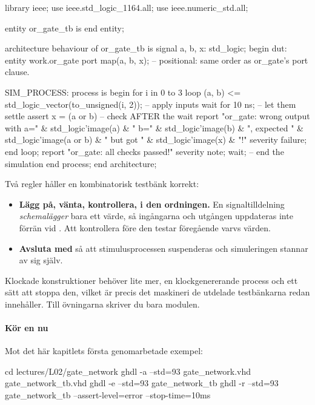 \begin{vhdlcode}
library ieee;
use ieee.std_logic_1164.all;
use ieee.numeric_std.all;

entity or_gate_tb is
end entity;

architecture behaviour of or_gate_tb is
signal a, b, x: std_logic;
begin
    dut: entity work.or_gate
        port map(a, b, x);   -- positional: same order as or_gate's port clause.

    SIM_PROCESS: process is
    begin
        for i in 0 to 3 loop
            (a, b) <= std_logic_vector(to_unsigned(i, 2));   -- apply inputs
            wait for 10 ns;                                  -- let them settle
            assert x = (a or b)                              -- check AFTER the wait
                report "or_gate: wrong output with a=" & std_logic'image(a)
                     & " b=" & std_logic'image(b)
                     & ", expected " & std_logic'image(a or b)
                     & " but got " & std_logic'image(x) & "!"
                severity failure;
        end loop;
        report "or_gate: all checks passed!" severity note;
        wait;                                                -- end the simulation
    end process;
end architecture;
\end{vhdlcode}

Två regler håller en kombinatorisk testbänk korrekt:
\begin{itemize}
  \item \textbf{Lägg på, vänta, kontrollera, i den ordningen.} En signaltilldelning
    \emph{schemalägger} bara ett värde, så ingångarna och utgången uppdateras inte förrän vid
    . Att kontrollera före den testar föregående varvs värden.
  \item \textbf{Avsluta med } så att stimulusprocessen suspenderas och simuleringen
    stannar av sig själv.
\end{itemize}

Klockade konstruktioner behöver lite mer, en klockgenererande process och ett sätt att stoppa den,
vilket är precis det maskineri de utdelade testbänkarna redan innehåller. Till övningarna skriver
du bara modulen.

\paragraph{Kör en nu}
Mot det här kapitlets första genomarbetade exempel:

\begin{shell}
cd lectures/L02/gate_network
ghdl -a --std=93 gate_network.vhd gate_network_tb.vhd
ghdl -e --std=93 gate_network_tb
ghdl -r --std=93 gate_network_tb --assert-level=error --stop-time=10ms
\end{shell}
